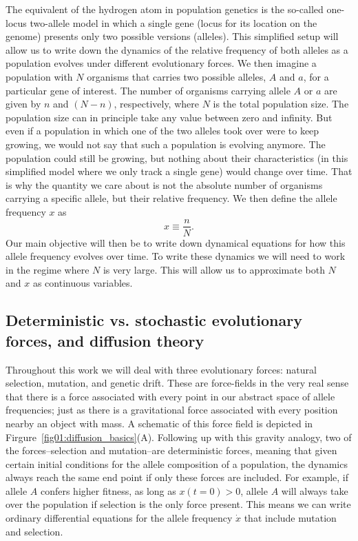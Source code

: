 The equivalent of the hydrogen atom in population genetics is the so-called
one-locus two-allele model in which a single gene (locus for its location on the
genome) presents only two possible versions (alleles). This simplified setup
will allow us to write down the dynamics of the relative frequency of both
alleles as a population evolves under different evolutionary forces. We then
imagine a population with $N$ organisms that carries two possible alleles, $A$
and $a$, for a particular gene of interest. The number of organisms carrying
allele $A$ or $a$ are given by $n$ and $(N - n)$, respectively, where $N$ is the
total population size. The population size can in principle take any value
between zero and infinity. But even if a population in which one of the two
alleles took over were to keep growing, we would not say that such a population
is evolving anymore. The population could still be growing, but nothing about
their characteristics (in this simplified model where we only track a single
gene) would change over time. That is why the quantity we care about is not the
absolute number of organisms carrying a specific allele, but their relative
frequency. We then define the allele frequency $x$ as
\begin{equation}
    x \equiv \frac{n}{N}.
\end{equation}
Our main objective will then be to write down dynamical equations for how this
allele frequency evolves over time. To write these dynamics we will need to work
in the regime where $N$ is very large. This will allow us to approximate both
$N$ and $x$ as continuous variables.

\subsection{Deterministic vs. stochastic evolutionary forces, and diffusion 
theory}

Throughout this work we will deal with three evolutionary forces: natural
selection, mutation, and genetic drift. These are force-fields in the very real
sense that there is a force associated with every point in our abstract space of
allele frequencies; just as there is a gravitational force associated with every
position nearby an object with mass. A schematic of this force field is depicted
in Firgure~\ref{fig01:diffusion_basics}(A). Following up with this gravity
analogy, two of the forces--selection and mutation--are deterministic forces,
meaning that given certain initial conditions for the allele composition of a
population, the dynamics always reach the same end point if only these forces
are included. For example, if allele $A$ confers higher fitness, as long as $x(t
= 0) > 0$, allele $A$ will always take over the population if selection is the
only force present. This means we can write ordinary differential equations for
the allele frequency $\dot{x}$ that include mutation and selection.

